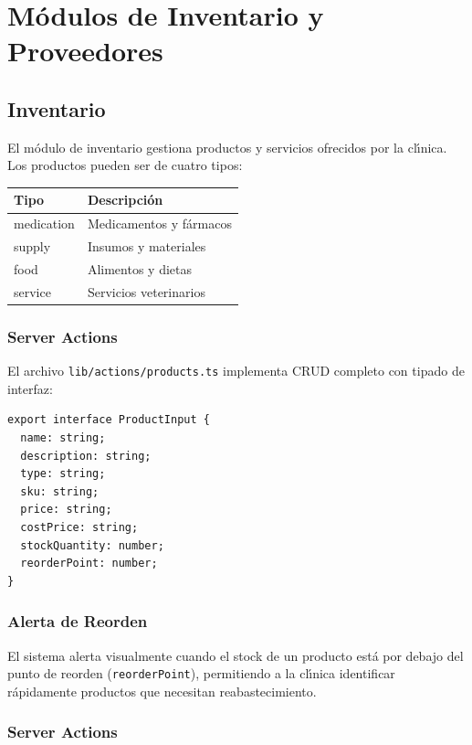 \chapter{M\'odulos de Inventario y Proveedores}

\section{Inventario}

El m\'odulo de inventario gestiona productos y servicios ofrecidos por la
cl\'{\i}nica. Los productos pueden ser de cuatro tipos:

\begin{longtable}{|l|l|}
\hline
\textbf{Tipo} & \textbf{Descripci\'on} \\
\hline
medication & Medicamentos y f\'armacos \\
supply & Insumos y materiales \\
food & Alimentos y dietas \\
service & Servicios veterinarios \\
\hline
\end{longtable}

\subsection{Server Actions}

El archivo \texttt{lib/actions/products.ts} implementa CRUD completo con
tipado de interfaz:

\begin{lstlisting}[style=typescript, caption=Interfaz ProductInput]
export interface ProductInput {
  name: string;
  description: string;
  type: string;
  sku: string;
  price: string;
  costPrice: string;
  stockQuantity: number;
  reorderPoint: number;
}
\end{lstlisting}

\subsection{Alerta de Reorden}

El sistema alerta visualmente cuando el stock de un producto est\'a por
debajo del punto de reorden (\texttt{reorderPoint}), permitiendo a la
cl\'{\i}nica identificar r\'apidamente productos que necesitan
reabastecimiento.

\subsection{Server Actions}

